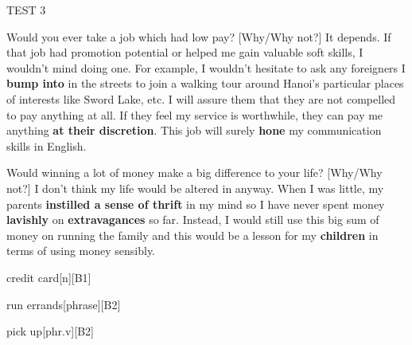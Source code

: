\begin{glossarymc}[Cambridge 13]
\begin{test}{TEST 3}
    \begin{qa}{Would you ever take a job which had low pay? [Why/Why not?]}
    It depends. If that job had promotion potential or helped me gain valuable soft skills, I wouldn’t mind doing one. For example, I wouldn’t hesitate to ask any foreigners I \textbf{bump into} in the streets to join a walking tour around Hanoi’s particular places of interests like Sword Lake, etc. I will assure them that they are not compelled to pay anything at all. If they feel my service is worthwhile, they can pay me anything \textbf{at their discretion}. This job will surely \textbf{hone} my communication skills in English.
    \end{qa}

    \begin{qa}{Would winning a lot of money make a big difference to your life? [Why/Why not?]}
    I don’t think my life would be altered in anyway. When I was little, my parents \textbf{instilled a sense of thrift} in my mind so I have never spent money \textbf{lavishly} on \textbf{extravagances} so far. Instead, I would still use this big sum of money on running the family and this would be a lesson for my \textbf{children} in terms of using money sensibly.
    \end{qa}

        \begin{VocabExplain}[Part 1]
            \begin{ExplainCard}{credit card}[n][B1]
            \end{ExplainCard}

            \begin{ExplainCard}{run errands}[phrase][B2]
            \end{ExplainCard}

            \begin{ExplainCard}{pick up}[phr.v][B2]
            \end{ExplainCard}


\end{VocabExplain}
\end{test}
\end{glossarymc}
